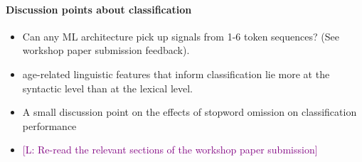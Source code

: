 \documentclass{report}
\newcommand{\len}[1]{\textcolor{purple}{[L: #1]}} %
\begin{document}
\paragraph{Discussion points about classification}
\begin{itemize}
    \item Can any ML architecture pick up signals from 1-6 token sequences? (See workshop paper submission feedback).
    \item age-related linguistic features that inform classification lie more at the syntactic level than at the lexical level.
    \item A small discussion point on the effects of stopword omission on classification performance
    \item \len{Re-read the relevant sections of the workshop paper submission}
\end{itemize}
\end{document}
